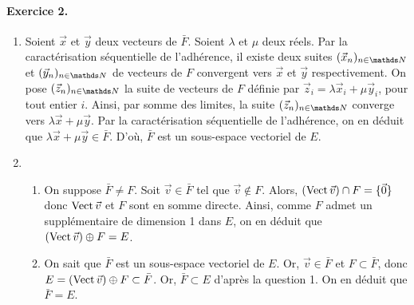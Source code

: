 \documentclass[a4paper]{article}
\begin{document}
	\paragraph{Exercice 2.}
	\begin{enumerate}
		\item Soient $\vec{x}$ et $\vec{y}$ deux vecteurs de $\bar{F}$. Soient $\lambda$ et $\mu$ deux réels. Par la caractérisation séquentielle de l'adhérence, il existe deux suites $(\vec{x}_n)_{n \in \N}$ et $(\vec{y}_n)_{n \in \N}$ de vecteurs de $F$ convergent vers $\vec{x}$ et $\vec{y}$ respectivement.
			On pose $(\vec{z}_n)_{n\in\N}$ la suite de vecteurs de $F$ définie par $\vec{z}_i = \lambda \vec{x}_i + \mu \vec{y}_i$, pour tout entier $i$.
			Ainsi, par somme des limites, la suite $(\vec{z}_n)_{n\in\N}$ converge vers $\lambda \vec{x} + \mu \vec{y}$.
			Par la caractérisation séquentielle de l'adhérence, on en déduit que $\lambda \vec{x} + \mu \vec{y} \in \bar{F}$.
			D'où, $\bar{F}$ est un sous-espace vectoriel de $E$.
		\item 
			\begin{enumerate}
				\item On suppose $\bar{F} \neq F$. Soit $\vec{v} \in \bar{F}$ tel que $\vec{v} \not\in F$.
					Alors, $(\operatorname{Vect} \vec{v}) \cap F = \{\vec{0}\}$ donc $\operatorname{Vect} \vec{v}$ et $F$ sont en somme directe.
					Ainsi, comme $F$ admet un supplémentaire de dimension 1 dans $E$, on en déduit que $(\operatorname{Vect}\vec{v}) \oplus F = E$.
				\item On sait que $\bar{F}$ est un sous-espace vectoriel de $E$.
					Or, $\vec{v} \in \bar{F}$ et $F \subset \bar{F}$, donc $E = (\operatorname{Vect} \vec{v}) \oplus F \subset \bar{F}$. Or, $\bar{F} \subset E$ d'après la question 1.
					On en déduit que $\bar{F} = E$.
			\end{enumerate}
	\end{enumerate}
\end{document}
